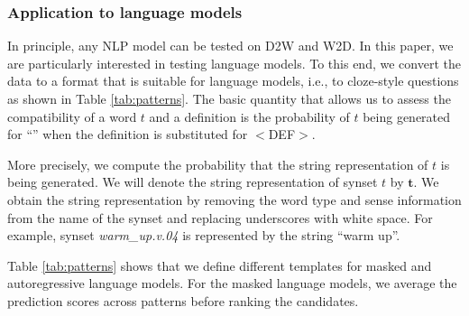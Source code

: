\documentclass[11pt,a4paper]{article}
\begin{document}
\subsubsection{Application to language models}
In principle, any NLP model can be tested on D2W and W2D.
In this paper, we are particularly
interested in testing language models. To this end, we 
convert the data to a format that is suitable for language
models, i.e., to cloze-style questions as
shown in Table
\ref{tab:patterns}. The basic quantity that allows us to
assess the compatibility of a word $t$ and a definition is the
probability of
$t$ being generated for 
``\underline{\hspace{3mm}}'' when the definition is substituted for $<$DEF$>$.

More precisely, we compute the probability that the string
representation of $t$ is being generated.
We will denote the string representation of synset $t$ by
$\bm{t}$. 
We obtain the string representation by removing
the word type and sense information from the name of the
synset and replacing underscores with white space. For
example, synset \emph{warm\_up.v.04}
is represented by
the string ``warm
up''.

Table \ref{tab:patterns} shows that we define different templates for masked and autoregressive language models.
For the masked language models, we average the prediction scores across patterns before ranking the candidates.
\end{document}
